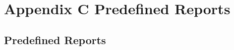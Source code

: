 %
\chapter*{\hypertarget{link:Appendix C Predefined Reports}{Appendix C Predefined Reports}}
\label{sec:appendix_d}

\section*{\hypertarget{link:Predefined Reports}{Predefined Reports}}
\label{sec:appendix_d:report}

